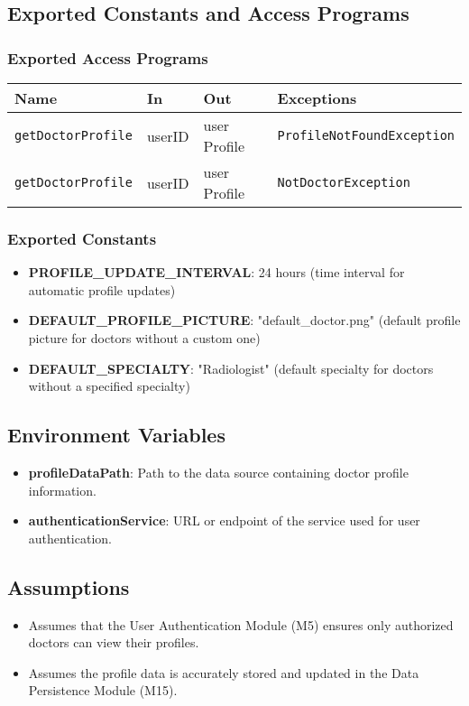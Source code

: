 \documentclass[12pt, titlepage]{article}
\begin{document}
\subsection{Exported Constants and Access Programs}
\subsubsection{Exported Access Programs}
\begin{tabular}{|l|l|l|l|}
    \hline
    \textbf{Name} & \textbf{In} & \textbf{Out} & \textbf{Exceptions} \\
    \hline 
    \texttt{getDoctorProfile} & userID & user Profile & \texttt{ProfileNotFoundException} \\
    \hline
    \texttt{getDoctorProfile} & userID & user Profile & \texttt{NotDoctorException } \\
    \hline
\end{tabular}

\subsubsection{Exported Constants}
\begin{itemize}
\item \textbf{PROFILE\_UPDATE\_INTERVAL}: 24 hours (time interval for automatic profile updates)
\item \textbf{DEFAULT\_PROFILE\_PICTURE}: "default\_doctor.png" (default profile picture for doctors without a custom one)
\item \textbf{DEFAULT\_SPECIALTY}: "Radiologist" (default specialty for doctors without a specified specialty)
\end{itemize}

\subsection{Environment Variables}
\begin{itemize}
\item \textbf{profileDataPath}: Path to the data source containing doctor profile information.
\item \textbf{authenticationService}: URL or endpoint of the service used for user authentication.
\end{itemize}

\subsection{Assumptions}
\begin{itemize}
\item Assumes that the User Authentication Module (M5) ensures only authorized doctors can view their profiles.
\item Assumes the profile data is accurately stored and updated in the Data Persistence Module (M15).
\end{itemize}
\end{document}
